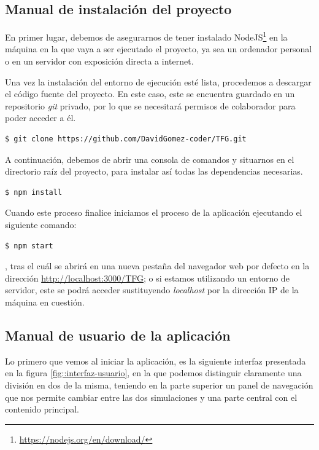 \documentclass[../main.tex]{subfiles}
\begin{document}
\label{app::manual_instalacion}
\subsection{Manual de instalación del proyecto}
En primer lugar, debemos de asegurarnos de tener instalado NodeJS\footnote{\url{ https://nodejs.org/en/download/}} en la máquina en la que vaya a ser ejecutado el proyecto, ya sea un ordenador personal o en un servidor con exposición directa a internet.

Una vez la instalación del entorno de ejecución esté lista, procedemos a descargar el código fuente del proyecto. En este caso, este se encuentra guardado en un repositorio \textit{git} privado, por lo que se necesitará permisos de colaborador para poder acceder a él. 

\begin{lstlisting}[language=bash]
  $ git clone https://github.com/DavidGomez-coder/TFG.git
\end{lstlisting}

A continuación, debemos de abrir una consola de comandos y situarnos en el directorio raíz del proyecto, para instalar así todas las dependencias necesarias. 

\begin{lstlisting}[language=bash]
  $ npm install
\end{lstlisting}

Cuando este proceso finalice iniciamos el proceso de la aplicación ejecutando el siguiente comando:

\begin{lstlisting}[language=bash]
  $ npm start
\end{lstlisting}

, tras el cuál se abrirá en una nueva pestaña del navegador web por defecto en la dirección \url{http://localhost:3000/TFG}; o si estamos utilizando un entorno de servidor, este se podrá acceder sustituyendo \textit{localhost} por la dirección IP de la máquina en cuestión.



\subsection{Manual de usuario de la aplicación}
Lo primero que vemos al iniciar la aplicación, es la siguiente interfaz presentada en la figura \ref{fig::interfaz-usuario}, en la que podemos distinguir claramente una división en dos de la misma, teniendo en la parte superior un panel de navegación que nos permite cambiar entre las dos simulaciones y una parte central con el contenido principal. \\
\end{document}
